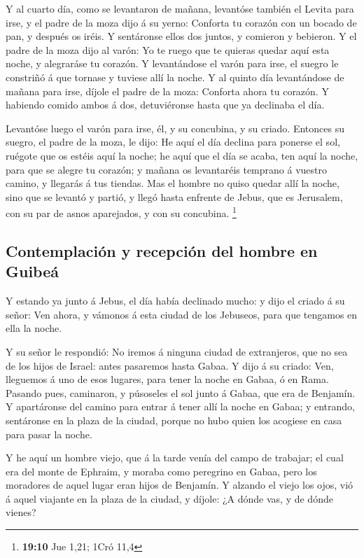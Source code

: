  Y al cuarto día, como se levantaron de mañana, levantóse
también el Levita para irse, y el padre de la moza dijo á su yerno:
Conforta tu corazón con un bocado de pan, y después os iréis.
 Y sentáronse ellos dos juntos, y comieron y bebieron. Y el
padre de la moza dijo al varón: Yo te ruego que te quieras quedar aquí
esta noche, y alegraráse tu corazón.  Y levantándose el
varón para irse, el suegro le constriñó á que tornase y tuviese allí la
noche.  Y al quinto día levantándose de mañana para irse,
díjole el padre de la moza: Conforta ahora tu corazón. Y habiendo comido
ambos á dos, detuviéronse hasta que ya declinaba el día.

 Levantóse luego el varón para irse, él, y su concubina, y
su criado. Entonces su suegro, el padre de la moza, le dijo: He aquí el
día declina para ponerse el sol, ruégote que os estéis aquí la noche; he
aquí que el día se acaba, ten aquí la noche, para que se alegre tu
corazón; y mañana os levantaréis temprano á vuestro camino, y llegarás á
tus tiendas.  Mas el hombre no quiso quedar allí la noche,
sino que se levantó y partió, y llegó hasta enfrente de Jebus, que es
Jerusalem, con su par de asnos aparejados, y con su concubina.
\footnote{\textbf{19:10} Jue 1,21; 1Cró 11,4}

\hypertarget{contemplaciuxf3n-y-recepciuxf3n-del-hombre-en-guibeuxe1}{%
\subsection{Contemplación y recepción del hombre en
Guibeá}\label{contemplaciuxf3n-y-recepciuxf3n-del-hombre-en-guibeuxe1}}

 Y estando ya junto á Jebus, el día había declinado mucho:
y dijo el criado á su señor: Ven ahora, y vámonos á esta ciudad de los
Jebuseos, para que tengamos en ella la noche.

 Y su señor le respondió: No iremos á ninguna ciudad de
extranjeros, que no sea de los hijos de Israel: antes pasaremos hasta
Gabaa. Y dijo á su criado:  Ven, lleguemos á uno de esos
lugares, para tener la noche en Gabaa, ó en Rama.  Pasando
pues, caminaron, y púsoseles el sol junto á Gabaa, que era de Benjamín.
 Y apartáronse del camino para entrar á tener allí la noche
en Gabaa; y entrando, sentáronse en la plaza de la ciudad, porque no
hubo quien los acogiese en casa para pasar la noche.

 Y he aquí un hombre viejo, que á la tarde venía del campo
de trabajar; el cual era del monte de Ephraim, y moraba como peregrino
en Gabaa, pero los moradores de aquel lugar eran hijos de Benjamín.
 Y alzando el viejo los ojos, vió á aquel viajante en la
plaza de la ciudad, y díjole: ¿A dónde vas, y de dónde vienes?

